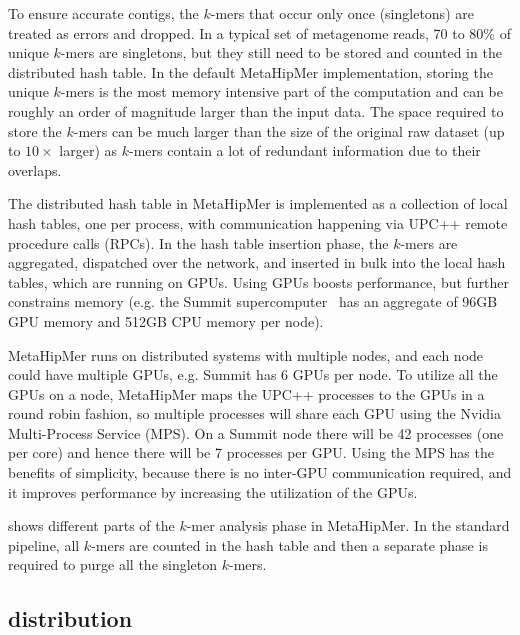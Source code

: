 To ensure accurate contigs, the $k$-mers that occur only once (singletons) are
treated as errors and dropped. In a typical set of metagenome reads, 70 to 80\%
of unique $k$-mers are singletons, but they still need to be stored and counted
in the distributed hash table. In the default MetaHipMer implementation, storing
the unique $k$-mers is the most memory intensive part of the computation and can
be roughly an order of magnitude larger than the input data.  The space required
to store the $k$-mers can be much larger than the size of the original raw
dataset (up to $10\times$ larger) as $k$-mers contain a lot of redundant
information due to their overlaps.

The distributed hash table in MetaHipMer is implemented as a collection of local
hash tables, one per process, with communication happening via UPC++ remote
procedure calls (RPCs). In the hash table insertion phase, the $k$-mers are
aggregated, dispatched over the network, and inserted in bulk into the local
hash tables, which are running on GPUs. Using GPUs boosts performance, but
further constrains memory (e.g. the Summit supercomputer~\cite{VazhkudaiDBG18}
has an aggregate of 96GB GPU memory and 512GB CPU memory per node).

MetaHipMer runs on distributed systems with multiple nodes, and each node could
have multiple GPUs, e.g. Summit has 6 GPUs per node. To utilize all the GPUs on
a node, MetaHipMer maps the UPC++ processes to the GPUs in a round robin
fashion, so multiple processes will share each GPU using the Nvidia
Multi-Process Service (MPS). On a Summit node there will be 42 processes (one
per core) and hence there will be 7 processes per GPU\@. Using the MPS has the
benefits of simplicity, because there is no inter-GPU communication required,
and it improves performance by increasing the utilization of the GPUs.

 shows different parts of the $k$-mer analysis phase in
MetaHipMer. In the standard pipeline, all $k$-mers are counted in the hash table
and then a separate phase is required to purge all the singleton $k$-mers.

\subsection{\Kmer distribution}

